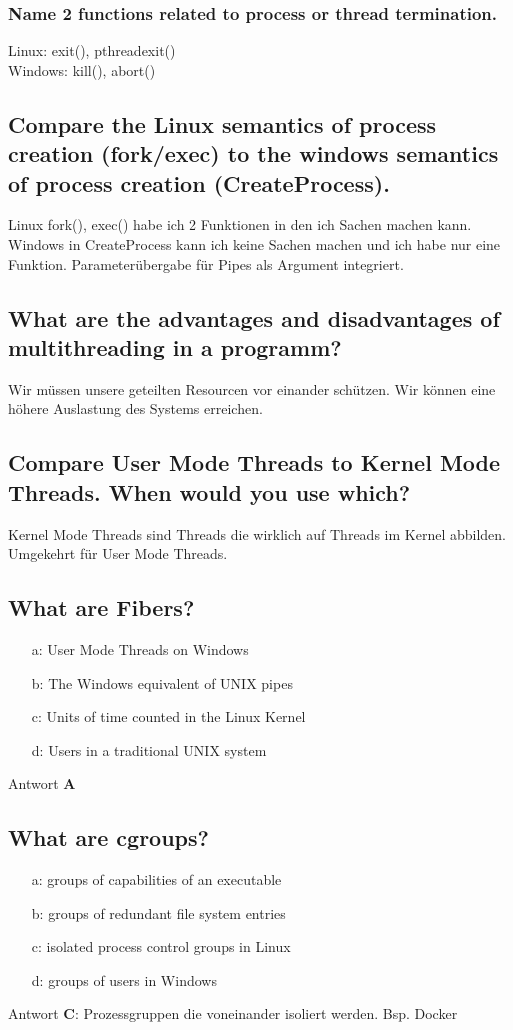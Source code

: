 \subsubsection{Name 2 functions related to process or thread termination.}
Linux: exit(), pthreadexit()\\Windows: kill(), abort()

\subsection{Compare the Linux semantics of process creation (fork/exec) to the windows semantics of process creation (CreateProcess).}
Linux fork(), exec() habe ich 2 Funktionen in den ich Sachen machen kann.\\
Windows in CreateProcess kann ich keine Sachen machen und ich habe nur eine Funktion. Parameter\"ubergabe f\"ur Pipes als Argument integriert.

\subsection{What are the advantages and disadvantages of multithreading in a programm?}
Wir m\"ussen unsere geteilten Resourcen vor einander sch\"utzen. Wir k\"onnen eine h\"ohere Auslastung des Systems erreichen.

\subsection{Compare User Mode Threads to Kernel Mode Threads. When would you use which?}
Kernel Mode Threads sind Threads die wirklich auf Threads im Kernel abbilden. Umgekehrt f\"ur User Mode Threads.

\subsection{What are Fibers?}
\begin{itemize}
	\setlength\itemsep{-0.5em}
	\item[a:] User Mode Threads on Windows
	\item[b:] The Windows equivalent of UNIX pipes
	\item[c:] Units of time counted in the Linux Kernel
	\item[d:] Users in a traditional UNIX system
\end{itemize}
Antwort \textbf{A}

\subsection{What are cgroups?}
\begin{itemize}
	\setlength\itemsep{-0.5em}
	\item[a:] groups of capabilities of an executable
	\item[b:] groups of redundant file system entries
	\item[c:] isolated process control groups in Linux
	\item[d:] groups of users in Windows
\end{itemize}
Antwort \textbf{C}: Prozessgruppen die voneinander isoliert werden. Bsp. Docker

